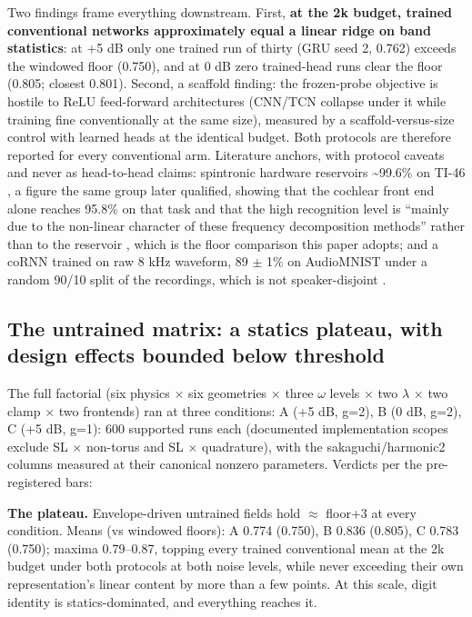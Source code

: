 \documentclass{article}
\begin{document}
Two findings frame everything downstream. First, \textbf{at the 2k
budget, trained conventional networks approximately equal a linear ridge
on band statistics}: at +5 dB only one trained run of thirty (GRU seed
2, 0.762) exceeds the windowed floor (0.750), and at 0 dB zero
trained-head runs clear the floor (0.805; closest 0.801). Second, a
scaffold finding: the frozen-probe objective is hostile to ReLU
feed-forward architectures (CNN/TCN collapse under it while training
fine conventionally at the same size), measured by a
scaffold-versus-size control with learned heads at the identical budget.
Both protocols are therefore reported for every conventional arm.
Literature anchors, with protocol caveats and never as head-to-head
claims: spintronic hardware reservoirs \textasciitilde99.6\% on TI-46
\citep{torrejon2017}, a figure the same group later qualified, showing
that the cochlear front end alone reaches 95.8\% on that task and that
the high recognition level is ``mainly due to the non-linear character
of these frequency decomposition methods'' rather than to the reservoir
\citep{abreu-araujo2020}, which is the floor comparison this paper
adopts; and a coRNN trained on raw 8 kHz waveform, 89 \ensuremath{\pm}
1\% on AudioMNIST under a random 90/10 split of the recordings, which is
not speaker-disjoint \citep{chandravadia2026}.

\subsection{The untrained matrix: a statics plateau, with design effects
bounded below
threshold}\label{the-untrained-matrix-a-statics-plateau-with-design-effects-bounded-below-threshold}

The full factorial (six physics \ensuremath{\times} six geometries
\ensuremath{\times} three \ensuremath{\omega} levels \ensuremath{\times}
two \ensuremath{\lambda} \ensuremath{\times} two clamp
\ensuremath{\times} two frontends) ran at three conditions: A (+5 dB,
g=2), B (0 dB, g=2), C (+5 dB, g=1): 600 supported runs each (documented
implementation scopes exclude SL \ensuremath{\times} non-torus and SL
\ensuremath{\times} quadrature), with the sakaguchi/harmonic2 columns
measured at their canonical nonzero parameters. Verdicts per the
pre-registered bars:

\textbf{The plateau.} Envelope-driven untrained fields hold
\ensuremath{\approx} floor+3 at every condition. Means (vs windowed
floors): A 0.774 (0.750), B 0.836 (0.805), C 0.783 (0.750); maxima
0.79--0.87, topping every trained conventional mean at the 2k budget
under both protocols at both noise levels, while never exceeding their
own representation's linear content by more than a few points. At this
scale, digit identity is statics-dominated, and everything reaches it.
\end{document}

